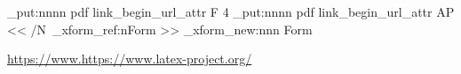 \documentclass{article}
\begin{document}
\ExplSyntaxOn
\hook_put:nnnn
          { pdf }
          { link_begin_url_attr }
          { F }
          { 4 }
\hook_put:nnnn
          { pdf }
          { link_begin_url_attr }
          { AP }
          { << /N~\pdf_xform_ref:n{Form} >> }
\pdf_xform_new:nnn {Form}{}
 {
  \colorbox{red}{}
 }
\par
\ExplSyntaxOff

\url{https://www.https://www.latex-project.org/}
\end{document}
